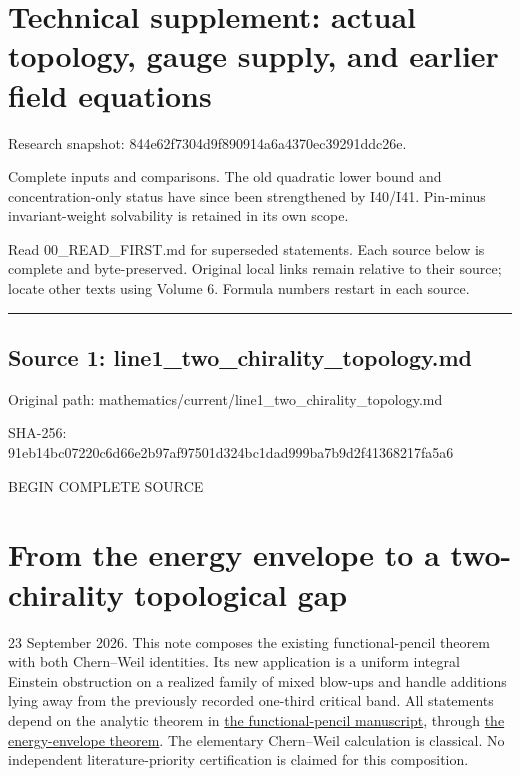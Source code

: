 \documentclass[
  10pt,
]{article}
\author{}
\date{}
\begin{document}
\hypertarget{technical-supplement-actual-topology-gauge-supply-and-earlier-field-equations}{%
\section{Technical supplement: actual topology, gauge supply, and
earlier field
equations}\label{technical-supplement-actual-topology-gauge-supply-and-earlier-field-equations}}

Research snapshot: 844e62f7304d9f890914a6a4370ec39291ddc26e.

Complete inputs and comparisons. The old quadratic lower bound and
concentration-only status have since been strengthened by I40/I41.
Pin-minus invariant-weight solvability is retained in its own scope.

Read 00\_READ\_FIRST.md for superseded statements. Each source below is
complete and byte-preserved. Original local links remain relative to
their source; locate other texts using Volume 6. Formula numbers restart
in each source.

\begin{center}\rule{0.5\linewidth}{0.5pt}\end{center}

\hypertarget{source-1-line1_two_chirality_topology.md}{%
\subsection{Source 1:
line1\_two\_chirality\_topology.md}\label{source-1-line1_two_chirality_topology.md}}

Original path: mathematics/current/line1\_two\_chirality\_topology.md

SHA-256:
91eb14bc07220c6d66e2b97af97501d324bc1dad999ba7b9d2f41368217fa5a6

BEGIN COMPLETE SOURCE

\hypertarget{from-the-energy-envelope-to-a-two-chirality-topological-gap}{%
\section{From the energy envelope to a two-chirality topological
gap}\label{from-the-energy-envelope-to-a-two-chirality-topological-gap}}

23 September 2026. This note composes the existing functional-pencil
theorem with both Chern--Weil identities. Its new application is a
uniform integral Einstein obstruction on a realized family of mixed
blow-ups and handle additions lying away from the previously recorded
one-third critical band. All statements depend on the analytic theorem
in \href{line1_functional_pencil.md}{the functional-pencil manuscript},
through \href{line1_energy_envelope_gap.md}{the energy-envelope
theorem}. The elementary Chern--Weil calculation is classical. No
independent literature-priority certification is claimed for this
composition.
\end{document}
